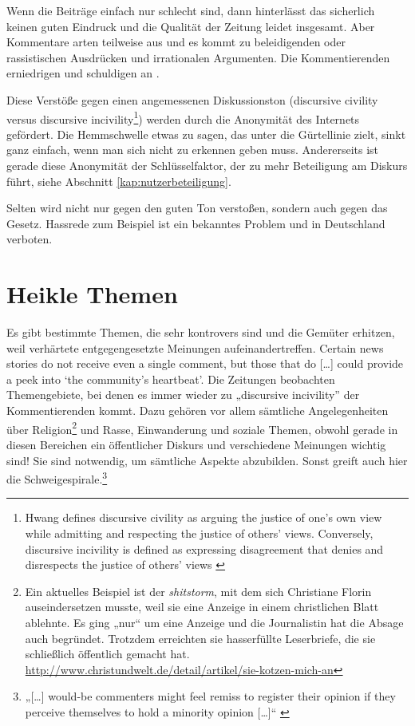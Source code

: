 Wenn die Beiträge einfach nur schlecht sind, dann hinterlässt das sicherlich
keinen guten Eindruck und die Qualität der Zeitung leidet insgesamt. Aber
Kommentare arten teilweise aus und es kommt zu beleidigenden oder rassistischen
Ausdrücken und irrationalen Argumenten. Die Kommentierenden erniedrigen und
schuldigen an \autocite[S.~103]{reich}.

Diese Verstöße gegen einen angemessenen Diskussionston (\glqq discursive
civility\grqq{} versus \glqq discursive incivility\grqq\footnote{Hwang defines
  \glqq discursive civility\grqq{} as arguing the justice of one's own view while
  admitting and respecting the justice of others' views. Conversely,
  \glqq discursive incivility\grqq{} is defined as expressing disagreement that denies
and disrespects the justice of others' views \autocite{hwang}
\autocite[S.~6/7]{santana:2014}}) werden durch die Anonymität des Internets
gefördert. Die Hemmschwelle etwas zu sagen, das unter die Gürtellinie zielt,
sinkt ganz einfach, wenn man sich nicht zu erkennen geben muss. Andererseits ist
gerade diese Anonymität der Schlüsselfaktor, der zu mehr Beteiligung am Diskurs
führt, siehe Abschnitt \ref{kap:nutzerbeteiligung}.

Selten wird nicht nur gegen den guten Ton verstoßen, sondern auch gegen das
Gesetz. Hassrede zum Beispiel ist ein bekanntes Problem und in Deutschland
verboten.


\section{Heikle Themen}
Es gibt bestimmte Themen, die sehr kontrovers sind und die Gemüter erhitzen,
weil verhärtete entgegengesetzte Meinungen aufeinandertreffen. \glqq Certain news
stories do not receive even a single comment, but those that do [\ldots] could
provide a peek into `the community’s heartbeat'.\grqq{} \autocite[S.~181]{loke} Die
Zeitungen beobachten Themengebiete, bei denen es immer wieder zu „discursive
incivility” der Kommentierenden kommt. Dazu gehören vor allem sämtliche
Angelegenheiten über Religion\footnote{Ein aktuelles Beispiel ist der {\slshape
shitstorm}, mit dem sich Christiane Florin auseindersetzen musste, weil sie eine
Anzeige in einem christlichen Blatt ablehnte. Es ging „nur“ um eine Anzeige und
die Journalistin hat die Absage auch begründet. Trotzdem erreichten sie
hasserfüllte Leserbriefe, die sie schließlich öffentlich gemacht hat.
\url{http://www.christundwelt.de/detail/artikel/sie-kotzen-mich-an}} und Rasse,
Einwanderung und soziale Themen, obwohl gerade in diesen Bereichen ein
öffentlicher Diskurs und verschiedene Meinungen wichtig sind! Sie sind
notwendig, um sämtliche Aspekte abzubilden. Sonst greift auch hier die
Schweigespirale.\footnote{„[\ldots] would-be commenters might feel remiss to
register their opinion if they perceive themselves to hold a minority opinion
[\ldots]“ \autocite[S.~12]{santana:2014}}

